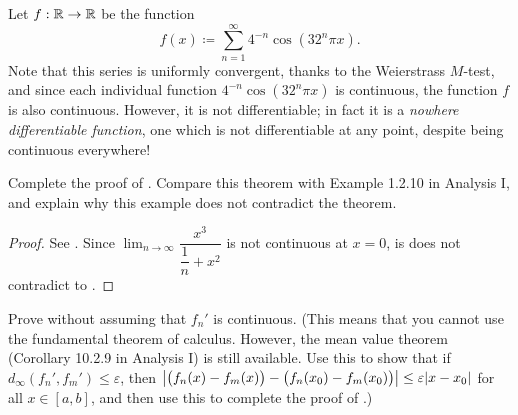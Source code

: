 \begin{eg}\label{ii:3.7.4}
  Let \(f : \mathbb{R} \to \mathbb{R}\) be the function
  \[
    f(x) \coloneqq \sum_{n = 1}^\infty 4^{-n} \cos(32^n \pi x).
  \]
  Note that this series is uniformly convergent, thanks to the Weierstrass \(M\)-test, and since each individual function \(4^{-n} \cos(32^n \pi x)\) is continuous, the function \(f\) is also continuous.
  However, it is not differentiable;
  in fact it is a \emph{nowhere differentiable function}, one which is not differentiable at any point, despite being continuous everywhere!
\end{eg}

\exercisesection

\begin{ex}\label{ii:ex:3.7.1}
  Complete the proof of .
  Compare this theorem with Example 1.2.10 in Analysis I, and explain why this example does not contradict the theorem.
\end{ex}

\begin{proof}
  See .
  Since \(\lim_{n \to \infty} \dfrac{x^3}{\dfrac{1}{n} + x^2}\) is not continuous at \(x = 0\), is does not contradict to .
\end{proof}

\begin{ex}\label{ii:ex:3.7.2}
  Prove  without assuming that \(f_n'\) is continuous.
  (This means that you cannot use the fundamental theorem of calculus.
  However, the mean value theorem (Corollary 10.2.9 in Analysis I) is still available.
  Use this to show that if \(d_\infty(f_n', f_m') \leq \varepsilon\), then \(\abs{\big(f_n(x) - f_m(x)\big) - \big(f_n(x_0) - f_m(x_0)\big)} \leq \varepsilon \abs{x - x_0}\) for all \(x \in [a, b]\), and then use this to complete the proof of .)
\end{ex}

